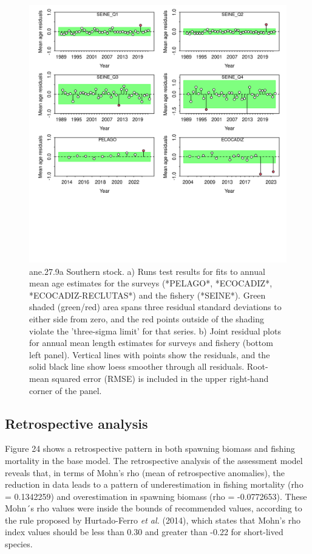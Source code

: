 \documentclass[
]{article}
\begin{document}
\begin{figure}[H]

{\centering \includegraphics[width=0.95\linewidth]{report/run/S1.0_4FLEETS_SelECO_RecIndex_Mnewfix/fig_runtest_residuals_age} 

}

\caption{ane.27.9a Southern stock. a) Runs test results for fits to annual mean age estimates for the surveys (*PELAGO*, *ECOCADIZ*, *ECOCADIZ-RECLUTAS*) and the fishery (*SEINE*). Green shaded (green/red) area spans three residual standard deviations to either side from zero, and the red points outside of the shading violate the 'three-sigma limit' for that series.  b) Joint residual plots for annual mean length estimates for surveys and fishery (bottom left panel).  Vertical lines with points show the residuals, and the solid black line show loess smoother through all residuals. Root-mean squared error (RMSE) is included in the upper right-hand corner of the panel.}\label{fig:unnamed-chunk-54}
\end{figure}

\hypertarget{retrospective-analysis}{%
\subsection{Retrospective analysis}\label{retrospective-analysis}}

Figure 24 shows a retrospective pattern in both spawning biomass and
fishing mortality in the base model. The retrospective analysis of the
assessment model reveals that, in terms of Mohn's rho (mean of
retrospective anomalies), the reduction in data leads to a pattern of
underestimation in fishing mortality (rho = 0.1342259) and
overestimation in spawning biomass (rho = -0.0772653). These Mohn´s rho
values were inside the bounds of recommended values, according to the
rule proposed by Hurtado-Ferro \emph{et al.} (2014), which states that
Mohn's rho index values should be less than 0.30 and greater than -0.22
for short-lived species.
\end{document}
